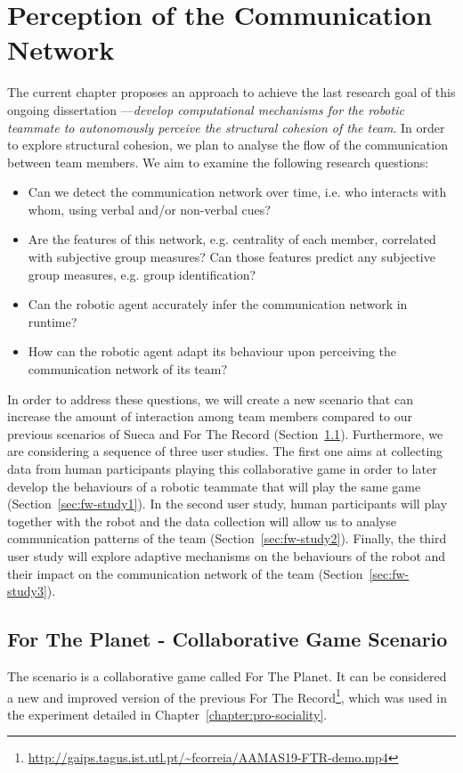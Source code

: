 \chapter{Perception of the Communication Network}
\label{chapter:future-work}

The current chapter proposes an approach to achieve the last research goal of this ongoing dissertation ---\textit{develop computational mechanisms for the robotic teammate to autonomously perceive the structural cohesion of the team}. In order to explore structural cohesion, we plan to analyse the flow of the communication between team members. We aim to examine the following research questions:
\begin{itemize}
    \item Can we detect the communication network over time, i.e. who interacts with whom, using verbal and/or non-verbal cues?
    \item Are the features of this network, e.g. centrality of each member, correlated with subjective group measures? Can those features predict any subjective group measures, e.g. group identification?
    \item Can the robotic agent accurately infer the communication network in runtime?
    \item How can the robotic agent adapt its behaviour upon perceiving the communication network of its team?
\end{itemize}

In order to address these questions, we will create a new scenario that can increase the amount of interaction among team members compared to our previous scenarios of Sueca and For The Record (Section~\ref{sec:scenario}). Furthermore, we are considering a sequence of three user studies. The first one aims at collecting data from human participants playing this collaborative game in order to later develop the behaviours of a robotic teammate that will play the same game (Section~\ref{sec:fw-study1}). In the second user study, human participants will play together with the robot and the data collection will allow us to analyse communication patterns of the team (Section~\ref{sec:fw-study2}). Finally, the third user study will explore adaptive mechanisms on the behaviours of the robot and their impact on the communication network of the team (Section~\ref{sec:fw-study3}).

\section{For The Planet - Collaborative Game Scenario}
\label{sec:scenario}
The scenario is a collaborative game called For The Planet. It can be considered a new and improved version of the previous For The Record\footnote{\url{http://gaips.tagus.ist.utl.pt/~fcorreia/AAMAS19-FTR-demo.mp4}}, which was used in the experiment detailed in Chapter~\ref{chapter:pro-sociality}.

